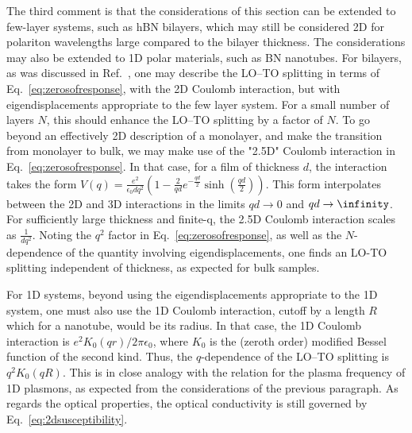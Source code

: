 \documentclass[aps,prb,twocolumn,
	           groupedaddress,superscriptaddress,
               amsfonts,amssymb,amsmath,floatfix,
	           citeautoscript]{revtex4-1}
\begin{document}
The third comment is that the considerations of this section can be extended to few-layer systems, such as hBN bilayers, which may still be considered 2D for polariton wavelengths large compared to the bilayer thickness. The considerations may also be extended to 1D polar materials, such as BN nanotubes. For bilayers, as was discussed in Ref.~, one may describe the LO--TO splitting in terms of Eq.~\eqref{eq:zerosofresponse}, with the 2D Coulomb interaction, but with eigendisplacements appropriate to the few layer system. For a small number of layers $N$, this should enhance the LO--TO splitting by a factor of $N$. To go beyond an effectively 2D description of a monolayer, and make the transition from monolayer to bulk, we may make use of the "2.5D" Coulomb interaction \cite{thygesen2017calculating} in Eq.~\ref{eq:zerosofresponse}. In that case, for a film of thickness $d$, the interaction takes the form $V(q) = \frac{e^2}{\epsilon_0 dq^2}\left(1-\frac{2}{qd}e^{-\frac{qd}{2}}\sinh\left(\frac{qd}{2}\right) \right)$. This form interpolates between the 2D and 3D interactions in the limits $qd \rightarrow 0$ and $qd \rightarrow \infinity$. For sufficiently large thickness and finite-q, the 2.5D Coulomb interaction scales as $\frac{1}{dq^2}$. Noting the $q^2$ factor in Eq.~\ref{eq:zerosofresponse}, as well as the $N$-dependence of the quantity involving eigendisplacements, one finds an LO-TO splitting independent of thickness, as expected for bulk samples.

For 1D systems, beyond using the eigendisplacements appropriate to the 1D system, one must also use the 1D Coulomb interaction, cutoff by a length $R$ which for a nanotube, would be its radius. In that case, the 1D Coulomb interaction is $e^2K_0(qr)/2\pi\epsilon_0$, where $K_0$ is the (zeroth order) modified Bessel function of the second kind. Thus, the $q$-dependence of the LO--TO splitting is $q^2K_0(qR)$. This is in close analogy with the relation for the plasma frequency of 1D plasmons, as expected from the considerations of the previous paragraph. As regards the optical properties, the optical conductivity is still governed by Eq.~\eqref{eq:2dsusceptibility}.
\end{document}
